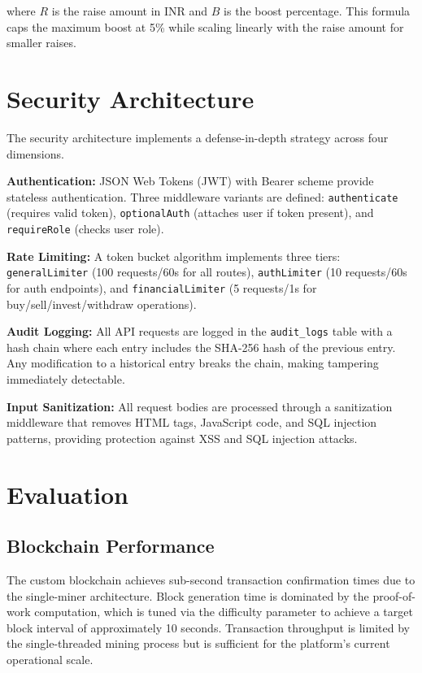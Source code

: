 \documentclass[conference]{IEEEtran}
\begin{document}
\noindent where $R$ is the raise amount in INR and $B$ is the boost percentage. This formula caps the maximum boost at 5\% while scaling linearly with the raise amount for smaller raises.

\section{Security Architecture}
\label{sec:security}

The security architecture implements a defense-in-depth strategy across four dimensions.

\textbf{Authentication:} JSON Web Tokens (JWT) with Bearer scheme provide stateless authentication. Three middleware variants are defined: \texttt{authenticate} (requires valid token), \texttt{optionalAuth} (attaches user if token present), and \texttt{requireRole} (checks user role).

\textbf{Rate Limiting:} A token bucket algorithm implements three tiers: \texttt{generalLimiter} (100 requests/60s for all routes), \texttt{authLimiter} (10 requests/60s for auth endpoints), and \texttt{financialLimiter} (5 requests/1s for buy/sell/invest/withdraw operations).

\textbf{Audit Logging:} All API requests are logged in the \texttt{audit\_logs} table with a hash chain where each entry includes the SHA-256 hash of the previous entry. Any modification to a historical entry breaks the chain, making tampering immediately detectable.

\textbf{Input Sanitization:} All request bodies are processed through a sanitization middleware that removes HTML tags, JavaScript code, and SQL injection patterns, providing protection against XSS and SQL injection attacks.

\section{Evaluation}
\label{sec:results}

\subsection{Blockchain Performance}

The custom blockchain achieves sub-second transaction confirmation times due to the single-miner architecture. Block generation time is dominated by the proof-of-work computation, which is tuned via the difficulty parameter to achieve a target block interval of approximately 10 seconds. Transaction throughput is limited by the single-threaded mining process but is sufficient for the platform's current operational scale.
\end{document}
